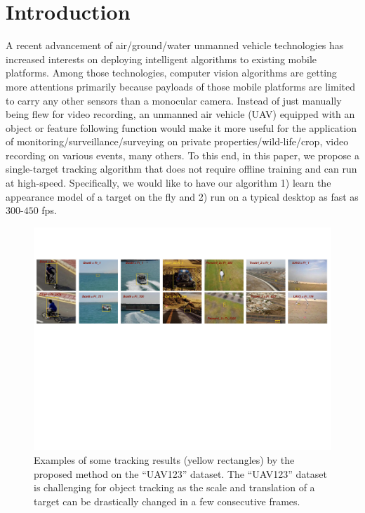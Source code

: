 \documentclass[10pt,twocolumn,letterpaper]{article}
\begin{document}
\section{Introduction}
\label{introduction}
A recent advancement of air/ground/water unmanned vehicle technologies
has increased interests on deploying intelligent algorithms to
existing mobile platforms. Among those technologies, computer vision
algorithms are getting more attentions primarily because payloads of
those mobile platforms are limited to carry any other sensors than a
monocular camera. Instead of just manually being flew for video
recording, an unmanned air vehicle (UAV) equipped with an object or
feature following function would make it more useful for the
application of monitoring/surveillance/surveying on private
properties/wild-life/crop, video recording on various events, many
others. To this end, in this paper, we propose a single-target
tracking algorithm that does not require offline training and can run
at high-speed. Specifically, we would like to have our algorithm 1)
learn the appearance model of a target on the fly and 2) run on a
typical desktop as fast as $300$-$450$ fps.

\begin{figure}[!h]
\centering
\includegraphics[width=\textwidth]{./figures/ResultsIntroduction.pdf}
\caption{Examples of some tracking results (yellow rectangles) by the
  proposed method on the ``UAV123'' dataset. The ``UAV123'' dataset is
  challenging for object tracking as the scale and translation of a
  target can be drastically changed in a few consecutive frames.}
\label{ResultsIntroduction}
\end{figure}
\end{document}
